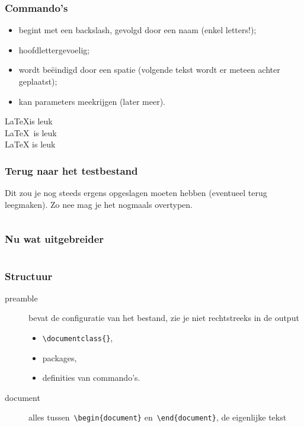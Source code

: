 \begin{frame}[fragile]
  \frametitle{Commando's}

  \begin{itemize}
	  \item begint met een backslash, gevolgd door een naam (enkel letters!);
	  \item hoofdlettergevoelig;
	  \item wordt be\"eindigd door een spatie (volgende tekst wordt er meteen achter geplaatst);
	  \item kan parameters meekrijgen (later meer).
  \end{itemize}

  \begin{LTXexample}[pos=r]
\LaTeX is leuk \\
\LaTeX~is leuk \\
\LaTeX{} is leuk
  \end{LTXexample}
\end{frame}

\begin{frame}
  \frametitle{Terug naar het testbestand}
  Dit zou je nog steeds ergens opgeslagen moeten hebben (eventueel terug leegmaken). Zo nee mag je het nogmaals overtypen.
  \inputminted{latex}{test-1.tex}
\end{frame}

\begin{frame}
  \frametitle{Nu wat uitgebreider}
  \inputminted{tex}{test-2.tex}
\end{frame}

\begin{frame}
  \frametitle{Structuur}

  \begin{description}
	\item[preamble] bevat de configuratie van het bestand, zie je niet rechtstreeks in de output
	  \begin{itemize}
      \item \texttt{\textcolor{uagreen}{\textbackslash documentclass}\{\}},
	  	\item packages,
	  	\item definities van commando's.
	  \end{itemize}
    \item[document] alles tussen~\texttt{\textcolor{uagreen}{\textbackslash begin}\{document\}} en~\texttt{\textcolor{uagreen}{\textbackslash end}\{document\}}, de eigenlijke tekst
  \end{description}
\end{frame}

